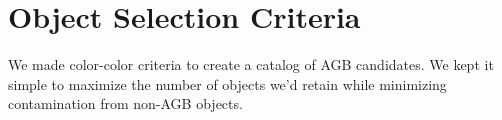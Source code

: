 \section{Object Selection Criteria}
\label{sec:criteria}
We made color-color criteria to create a catalog of AGB candidates. We kept it simple to maximize the number of objects we'd retain while minimizing contamination from non-AGB objects.
